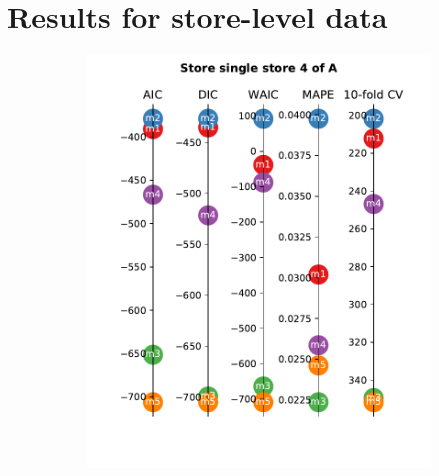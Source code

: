 \documentclass[english, 12pt, a4paper, sci, utf8, a-1b, online]{aaltothesis}
\begin{document}
 





\clearpage




\clearpage
\thesisappendix

\section{Results for store-level data\label{app:single_store_results}}

\begin{figure}[hbt]
	\begin{subfigure}[htb]{0.3\textwidth}
		\centering
		\includegraphics[width=\textwidth]{../plots/metrics/metrics_plot_single_store_4_of_A.pdf}
	\end{subfigure}
	\hfill
	\begin{subfigure}[htb]{0.3\textwidth}
		\centering

\end{subfigure}
\end{figure}
\end{document}
